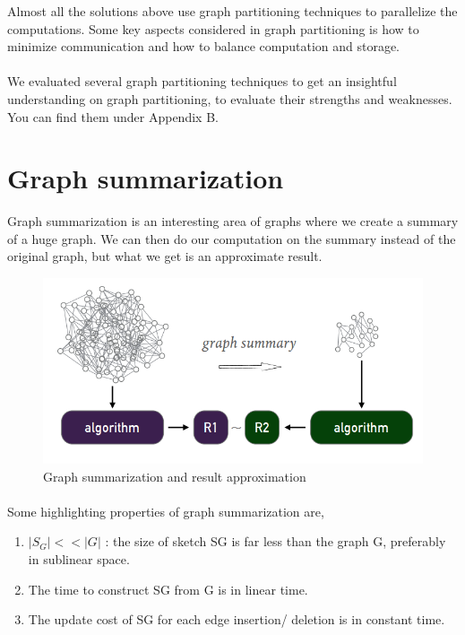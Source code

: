 \documentclass[12pt]{report}
\numberwithin{figure}{section}
\numberwithin{table}{section}
\begin{document}
Almost all the solutions above use graph partitioning techniques to parallelize the computations. Some key aspects considered in graph partitioning is how to minimize communication and how to balance computation and storage. 

\paragraph{}

We evaluated several graph partitioning techniques to get an insightful understanding on graph partitioning, to evaluate their strengths and weaknesses. You can find them under Appendix B. 

\section{Graph summarization}
Graph summarization is an interesting area of graphs where we create a summary of a huge graph. We can then do our computation on the summary instead of the original graph, but what we get is an approximate result. 

\begin{figure}[H]
\centering
\includegraphics[scale=0.6]{images/image02}
\caption{Graph summarization and result approximation}
\end{figure}

\paragraph{}
Some highlighting properties of graph summarization are, 

\begin{enumerate}

\item $ | S_G | << | G |$ : the size of sketch SG is far less than the graph G, preferably in sublinear space.
\item The time to construct SG from G is in linear time.
\item The update cost of SG for each edge insertion/ deletion is in constant time.

\end{enumerate}
\end{document}

